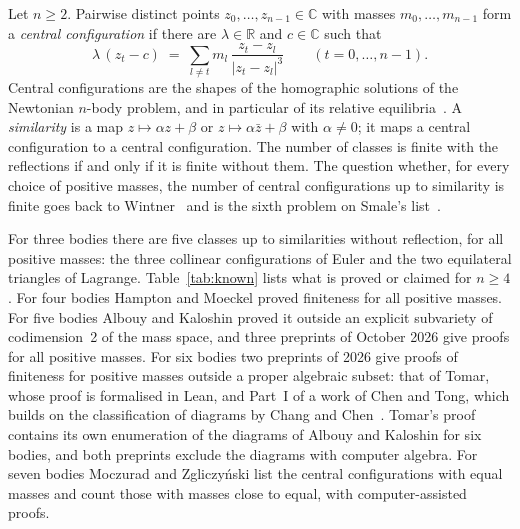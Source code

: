 \documentclass[11pt]{amsart}
\theoremstyle{definition}
\theoremstyle{remark}
\numberwithin{equation}{section}
\newcommand{\CC}{\mathbb{C}}
\newcommand{\RR}{\mathbb{R}}
\begin{document}
Let $n \ge 2$. Pairwise distinct points $z_0, \dots, z_{n-1} \in \CC$ with masses $m_0, \dots, m_{n-1}$
form a \emph{central configuration} if there are $\lambda \in \RR$ and $c \in \CC$ such that
\begin{equation}\label{eq:cc}
  \lambda\,(z_t - c) \;=\; \sum_{l \ne t} m_l\, \frac{z_t - z_l}{|z_t - z_l|^{3}}
  \qquad (t = 0, \dots, n-1).
\end{equation}
Central configurations are the shapes of the homographic solutions of the Newtonian $n$-body problem,
and in particular of its relative equilibria~\cite{wintner1941}. A \emph{similarity} is a map
$z \mapsto \alpha z + \beta$ or $z \mapsto \alpha \bar z + \beta$ with $\alpha \ne 0$; it maps a central
configuration to a central configuration. The number of classes is finite with the reflections if and
only if it is finite without them. The question whether, for every choice of positive masses, the
number of central configurations up to similarity is finite goes back to Wintner~\cite{wintner1941} and
is the sixth problem on Smale's list~\cite{smale1998}.

For three bodies there are five classes up to similarities without reflection, for all positive masses:
the three collinear configurations of Euler and the two equilateral triangles of Lagrange.
Table~\ref{tab:known} lists what is proved or claimed for $n \ge 4$. For four bodies Hampton and Moeckel proved finiteness for all positive masses.
For five bodies Albouy and Kaloshin proved it outside an explicit subvariety of codimension~2 of the mass
space, and three preprints of October 2026 give proofs for all positive masses. For six bodies two preprints
of 2026 give proofs of finiteness for positive masses outside a proper algebraic subset: that of Tomar, whose
proof is formalised in Lean, and Part~I of a work of Chen and Tong, which builds on the classification of
diagrams by Chang and Chen~\cite{changchen2024jsc,changchen2025siads}. Tomar's proof contains its own
enumeration of the diagrams of Albouy and Kaloshin for six bodies, and both preprints exclude the diagrams
with computer algebra. For seven bodies Moczurad
and Zgliczy\'nski list the central configurations with equal masses and count those with masses close
to equal, with computer-assisted proofs.
\end{document}
